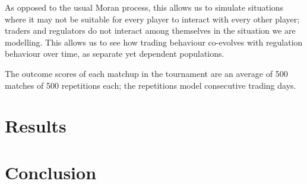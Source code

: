 \documentclass{article}
\begin{document}
As opposed to the usual Moran process, this allows us to simulate situations where it may not be suitable for every player to interact with every other player; traders and regulators do not interact among themselves in the situation we are modelling. This allows us to see how trading behaviour co-evolves with regulation behaviour over time, as separate yet dependent populations.

The outcome scores of each matchup in the tournament are an average of 500 matches of 500 repetitions each; the repetitions model consecutive trading days.

\section{Results}

\section{Conclusion}


\end{document}

